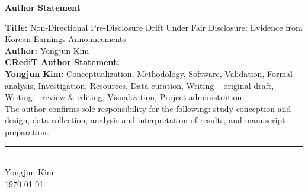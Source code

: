 \documentclass[12pt]{article}
\begin{document}
\thispagestyle{empty}

\begin{center}
{\LARGE\bfseries Author Statement}\\[2em]
\end{center}

\noindent\textbf{Title:} Non-Directional Pre-Disclosure Drift Under Fair Disclosure: Evidence from Korean Earnings Announcements\\[1em]

\noindent\textbf{Author:} Yongjun Kim\\[2em]

\noindent\textbf{CRediT Author Statement:}\\[1em]

\noindent\textbf{Yongjun Kim:} Conceptualization, Methodology, Software, Validation, Formal analysis, Investigation, Resources, Data curation, Writing -- original draft, Writing -- review \& editing, Visualization, Project administration.\\[3em]

\noindent The author confirms sole responsibility for the following: study conception and design, data collection, analysis and interpretation of results, and manuscript preparation.\\[3em]

\noindent\rule{5cm}{0.4pt}\\
Yongjun Kim\\
\today
\end{document}
